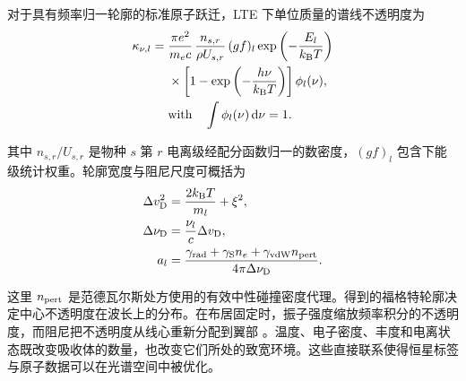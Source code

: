 对于具有频率归一轮廓的标准原子跃迁，LTE 下单位质量的谱线不透明度为 \citep{Gray2005}
\begin{equation}
\begin{aligned}
\kappa_{\nu,l}={}&
\frac{\pi e^2}{m_e c}\,
\frac{n_{s,r}}{\rho U_{s,r}}\,(gf)_l
\exp\left(-\frac{E_l}{k_{\rm B}T}\right) \\
&{}\times
\left[1-\exp\left(-\frac{h\nu}{k_{\rm B}T}\right)\right]\phi_l(\nu), \\
&\text{with}\quad \int\phi_l(\nu)\,\mathrm{d}\nu=1 .
\end{aligned}
\end{equation}

\noindent 其中 $n_{s,r}/U_{s,r}$ 是物种 $s$ 第 $r$ 电离级经配分函数归一的数密度，$(gf)_l$ 包含下能级统计权重。轮廓宽度与阻尼尺度可概括为
\begin{equation}
\begin{aligned}
\Delta v_{\rm D}^{2} &=
\frac{2k_{\rm B}T}{m_l}+\xi^2, \\
\Delta\nu_{\rm D} &= \frac{\nu_l}{c}\Delta v_{\rm D}, \\
a_l &=
\frac{\gamma_{\rm rad}+\gamma_{\rm S}n_e+
\gamma_{\rm vdW}n_{\rm pert}}{4\pi\Delta\nu_{\rm D}} .
\end{aligned}
\end{equation}

\noindent 这里 $n_{\rm pert}$ 是范德瓦尔斯处方使用的有效中性碰撞密度代理。得到的福格特轮廓决定中心不透明度在波长上的分布。在布居固定时，振子强度缩放频率积分的不透明度，而阻尼把不透明度从线心重新分配到翼部 \citep{Barklem2000,Gray2005}。温度、电子密度、丰度和电离状态既改变吸收体的数量，也改变它们所处的致宽环境。这些直接联系使得恒星标签与原子数据可以在光谱空间中被优化。

